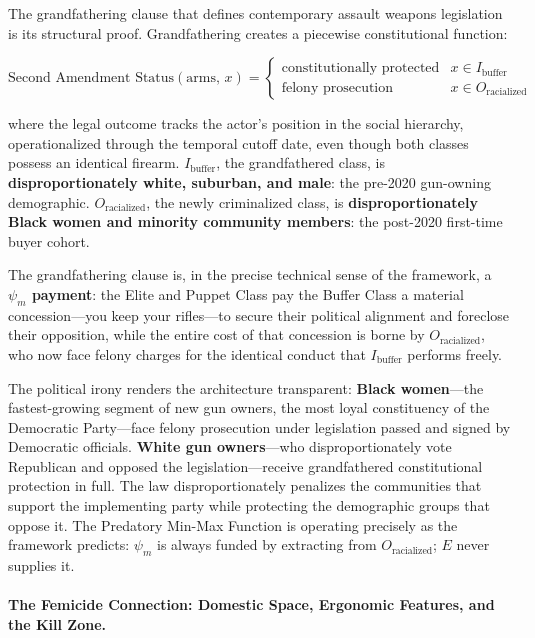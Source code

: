 The grandfathering clause that defines contemporary assault weapons legislation is its structural proof. Grandfathering creates a piecewise constitutional function:

\begin{equation}
\label{eq:awb_dualtrack}
\text{Second Amendment Status}(\text{arms},\, x) =
\begin{cases}
\text{constitutionally protected} & x \in I_{\text{buffer}} \\
\text{felony prosecution} & x \in O_{\text{racialized}}
\end{cases}
\end{equation}

where the legal outcome tracks the actor's position in the social hierarchy, operationalized through the temporal cutoff date, even though both classes possess an identical firearm. $I_{\text{buffer}}$, the grandfathered class, is \textbf{disproportionately white, suburban, and male}: the pre-2020 gun-owning demographic. $O_{\text{racialized}}$, the newly criminalized class, is \textbf{disproportionately Black women and minority community members}: the post-2020 first-time buyer cohort.

The grandfathering clause is, in the precise technical sense of the framework, a \textbf{$\psi_m$ payment}: the Elite and Puppet Class pay the Buffer Class a material concession---you keep your rifles---to secure their political alignment and foreclose their opposition, while the entire cost of that concession is borne by $O_{\text{racialized}}$, who now face felony charges for the identical conduct that $I_{\text{buffer}}$ performs freely.

The political irony renders the architecture transparent: \textbf{Black women}---the fastest-growing segment of new gun owners, the most loyal constituency of the Democratic Party---face felony prosecution under legislation passed and signed by Democratic officials. \textbf{White gun owners}---who disproportionately vote Republican and opposed the legislation---receive grandfathered constitutional protection in full. The law disproportionately penalizes the communities that support the implementing party while protecting the demographic groups that oppose it. The Predatory Min-Max Function is operating precisely as the framework predicts: $\psi_m$ is always funded by extracting from $O_{\text{racialized}}$; $E$ never supplies it.

\paragraph{The Femicide Connection: Domestic Space, Ergonomic Features, and the Kill Zone.}

